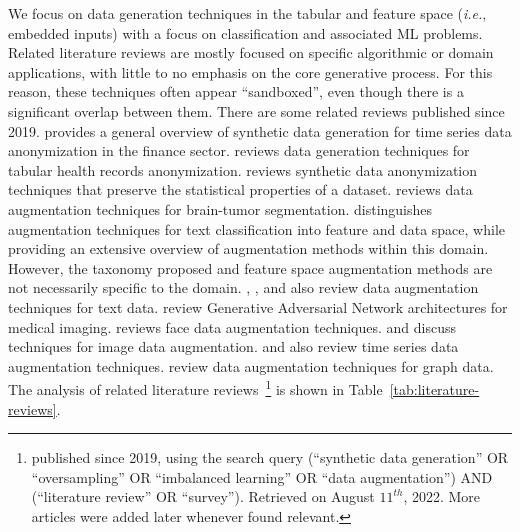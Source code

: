 \documentclass[parskip=full]{scrartcl}
\begin{document}
We focus on data generation techniques in the tabular and feature space
(\textit{i.e.}, embedded inputs) with a focus on classification and associated
ML problems. Related literature reviews are mostly focused on specific
algorithmic or domain applications, with little to no emphasis on the core
generative process. For this reason, these techniques often appear
``sandboxed'', even though there is a significant overlap between them. There
are some related reviews published since 2019. \citet{assefa2020generating}
provides a general overview of synthetic data generation for time series data
anonymization in the finance sector. \citet{hernandez2022synthetic} reviews
data generation techniques for tabular health records anonymization.
\citet{raghunathan2021synthetic} reviews synthetic data anonymization
techniques that preserve the statistical properties of a dataset.
\citet{nalepa2019data} reviews data augmentation techniques for brain-tumor
segmentation. \citet{bayer2021survey} distinguishes augmentation techniques
for text classification into feature and data space, while providing an
extensive overview of augmentation methods within this domain. However, the
taxonomy proposed and feature space augmentation methods are not necessarily
specific to the domain. \citet{shorten2021text}, \citet{chen2021empirical},
\citet{feng2021survey} and \citet{liu2020survey} also review data augmentation
techniques for text data.  \citet{yi2019generative} review Generative
Adversarial Network architectures for medical imaging. \citet{wang2020survey}
reviews face data augmentation techniques. \citet{shorten2019survey} and
\citet{khosla2020enhancing} discuss techniques for image data augmentation.
\citet{iwana2021empirical} and \citet{wen2020time} also review time series
data augmentation techniques.  \citet{zhao2022graph} review data augmentation
techniques for graph data. The analysis of related literature
reviews~\footnote{%
    published since 2019, using the search query {\selectfont
        (``synthetic data generation'' OR ``oversampling'' OR ``imbalanced
    learning'' OR ``data augmentation'') AND (``literature review'' OR
``survey'')}. Retrieved on August $11^{th}$, 2022. More articles were added
later whenever found relevant.  } is shown in
Table~\ref{tab:literature-reviews}.
\end{document}
